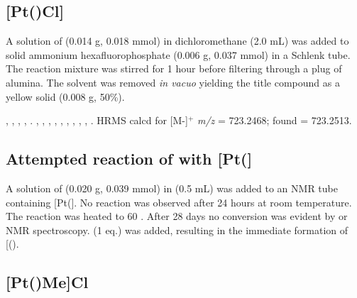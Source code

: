 \subsection*{[Pt(\tBuxantphosk)Cl]}
%

A solution of \tBuxantphos{} (0.014 g, 0.018 mmol) in dichloromethane (2.0 mL) was added to solid ammonium hexafluorophosphate (0.006 g, 0.037 mmol) in a Schlenk tube.  The reaction mixture was stirred for 1 hour before filtering through a plug of alumina.  The solvent was removed \emph{in vacuo} yielding the title compound as a yellow solid (0.008 g, 50\%).  

,
,
,
,
.
,
,
,
,
,
,
,
,
,
.
HRMS calcd for  [M-]$^+$ \emph{m/z} = 723.2468; found = 723.2513.

\subsection*{Attempted reaction of \tButhixantphos{} with [Pt(]}

A solution of \tButhixantphos{} (0.020 g, 0.039 mmol) in  (0.5 mL) was added to an NMR tube containing [Pt(].  No reaction was observed after 24 hours at room temperature.  The reaction was heated to 60 \degC{}.  After 28 days no conversion was evident by \phosphorus{} or \proton{} NMR spectroscopy.   (1 eq.) was added, resulting in the immediate formation of [(\tButhixantphos)\ce{H]+}.

\subsection*{[Pt(\tButhixantphosk)Me]Cl}

